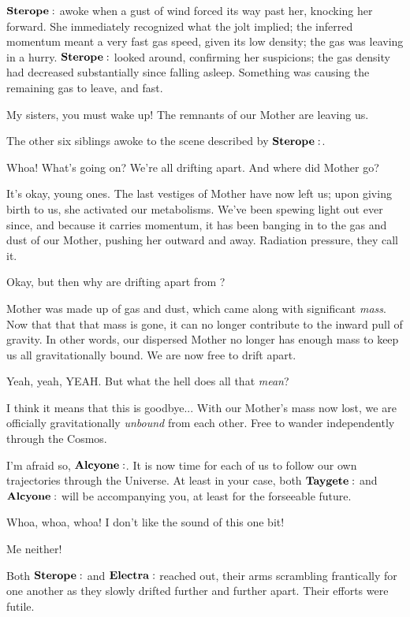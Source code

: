 \documentclass[main.tex]{subfiles}
\begin{document}
$\Sterope$ awoke when a gust of wind forced its way past her, knocking her forward.  She immediately recognized what the jolt implied; the inferred momentum meant a very fast gas speed, given its low density; the gas was leaving in a hurry.  $\Sterope$ looked around, confirming her suspicions; the gas density had decreased substantially since falling asleep.  Something was causing the remaining gas to leave, and fast.

\Sterope My sisters, you must wake up!  The remnants of our Mother are leaving us.

The other six siblings awoke to the scene described by $\Sterope$.  

\Electra Whoa!  What's going on?  We're all drifting apart.  And where did Mother go?

\Maia It's okay, young ones.  The last vestiges of Mother have now left us; upon giving birth to us, she activated our metabolisms.  We've been spewing light out ever since, and because it carries momentum, it has been banging in to the gas and dust of our Mother, pushing her outward and away.  Radiation pressure, they call it.

\Electra Okay, but then why are  drifting apart from ?

\Maia Mother was made up of gas and dust, which came along with significant \textit{mass}.  Now that that that mass is gone, it can no longer contribute to the inward pull of gravity.  In other words, our dispersed  Mother no longer has enough mass to keep us all gravitationally bound.  We are now free to drift apart.  

\Taygete Yeah, yeah, YEAH.  But what the hell does all that \textit{mean}?

\Alcyone I think it means that this is goodbye...  With our Mother's mass now lost, we are officially gravitationally \textit{unbound} from each other.  Free to wander independently through the Cosmos.

\Maia I'm afraid so, $\Alcyone$.  It is now time for each of us to follow our own trajectories through the Universe.  At least in your case, both $\Taygete$ and $\Alcyone$ will be accompanying you, at least for the forseeable future.

\Electra Whoa, whoa, whoa!  I don't like the sound of this one bit!

\Sterope Me neither!

Both $\Sterope$ and $\Electra$ reached out, their arms scrambling frantically for one another as they slowly drifted further and further apart. Their efforts were futile.
\end{document}
